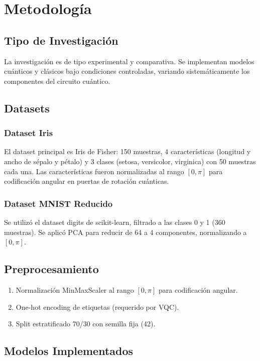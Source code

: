 \section{Metodolog\'ia}

\subsection{Tipo de Investigaci\'on}
La investigaci\'on es de tipo experimental y comparativa. Se implementan modelos cu\'anticos y cl\'asicos bajo condiciones controladas, variando sistem\'aticamente los componentes del circuito cu\'antico.

\subsection{Datasets}

\subsubsection{Dataset Iris}
El dataset principal es Iris de Fisher: 150 muestras, 4 caracter\'isticas (longitud y ancho de s\'epalo y p\'etalo) y 3 clases (setosa, versicolor, virginica) con 50 muestras cada una. Las caracter\'isticas fueron normalizadas al rango $[0, \pi]$ para codificaci\'on angular en puertas de rotaci\'on cu\'anticas.

\subsubsection{Dataset MNIST Reducido}
Se utiliz\'o el dataset digits de scikit-learn, filtrado a las clases 0 y 1 (360 muestras). Se aplic\'o PCA para reducir de 64 a 4 componentes, normalizando a $[0, \pi]$.

\subsection{Preprocesamiento}
\begin{enumerate}
    \item Normalizaci\'on MinMaxScaler al rango $[0, \pi]$ para codificaci\'on angular.
    \item One-hot encoding de etiquetas (requerido por VQC).
    \item Split estratificado 70/30 con semilla fija (42).
\end{enumerate}

\subsection{Modelos Implementados}

